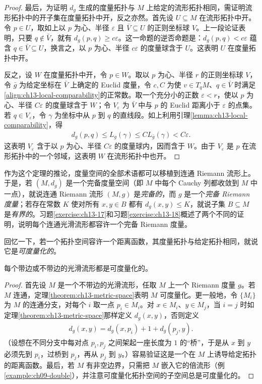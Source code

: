 \documentclass[../../main.tex]{subfiles}
\begin{document}
\begin{proof}
最后，为证明 $d_g$ 生成的度量拓扑与 $M$ 上给定的流形拓扑相同，需证明流形拓扑中的开子集在度量拓扑中开，反之亦然。首先设 $U\subseteq M$ 在流形拓扑中开。令 $p\in U$，取如上以 $p$ 为心、半径 $\varepsilon$ 且 $\bar V\subseteq U$ 的正则坐标球 $V$。上一段论证表明，只要 $q\notin\bar V$，就有 $d_g(p,q)\geqslant c\varepsilon$。这一命题的逆否命题是：$d_g(p,q)<c\varepsilon$ 蕴含 $q\in\bar V\subseteq U$，换言之，以 $p$ 为心、半径 $c\varepsilon$ 的度量球含于 $U$。这表明 $U$ 在度量拓扑中开。

反之，设 $W$ 在度量拓扑中开，令 $p\in W$。取以 $p$ 为心、半径 $r$ 的正则坐标球 $V$，令 $\bar g$ 为给定坐标在 $\bar V$ 上确定的 Euclid 度量，令 $c,C$ 为使 $v\in T_qM$、$q\in\bar V$ 时满足\eqref{align:ch13-local-comparability}的正常数。取一个充分小的正数 $\varepsilon<r$，使以 $p$ 为心、半径 $C\varepsilon$ 的度量球含于 $W$；令 $V_\varepsilon$ 为 $\bar V$ 中与 $p$ 的 Euclid 距离小于 $\varepsilon$ 的点集。若 $q\in V_\varepsilon$，令 $\gamma$ 为坐标中从 $p$ 到 $q$ 的直线段。如上利用引理\ref{lemma:ch13-local-comparability}，得
\begin{align*}
d_g(p,q)\leqslant L_g(\gamma)\leqslant CL_{\bar g}(\gamma)<C\varepsilon.
\end{align*}
这表明 $V_\varepsilon$ 含于以 $p$ 为心、半径 $C\varepsilon$ 的度量球内，因而含于 $W$。由于 $V_\varepsilon$ 是 $p$ 在流形拓扑中的一个邻域，这表明 $W$ 在流形拓扑中也开。
\end{proof}

作为这个定理的推论，度量空间的全部术语都可以移植到连通 Riemann 流形上。于是，若 $(M,d_g)$ 是一个完备度量空间（即 $M$ 中每个 Cauchy 列都收敛到 $M$ 中一点），就说连通 Riemann 流形 $(M,g)$ 是\emph{完备的}，而 $g$ 是一个\emph{完备 Riemann 度量}；若存在常数 $K$ 使对所有 $x,y\in B$ 都有 $d_g(x,y)\leqslant K$，就说子集 $B\subseteq M$ 是\emph{有界的}。习题\ref{exercise:ch13-17}和习题\ref{exercise:ch13-18}概述了两个不同的证明，说明每个连通光滑流形都容许一个完备 Riemann 度量。

回忆一下，若一个拓扑空间容许一个距离函数，其度量拓扑与给定拓扑相同，就说它是\emph{可度量化的}。

\begin{corollary}\label{corollary:ch13-metrizable}
每个带边或不带边的光滑流形都是可度量化的。
\end{corollary}

\begin{proof}
首先设 $M$ 是一个不带边的光滑流形，任取 $M$ 上一个 Riemann 度量 $g$。若 $M$ 连通，定理\ref{theorem:ch13-metric-space}表明 $M$ 可度量化。更一般地，令 $\{M_i\}$ 为 $M$ 的连通分支，对每个 $i$ 取一点 $p_i\in M_i$。对 $x\in M_i$、$y\in M_j$，当 $i=j$ 时如定理\ref{theorem:ch13-metric-space}那样定义 $d_g(x,y)$，否则定义
\begin{align*}
d_g(x,y)=d_g(x,p_i)+1+d_g(p_j,y).
\end{align*}
（设想在不同分支中每对点 $p_i,p_j$ 之间架起一座长度为 $1$ 的“桥”，于是从 $x$ 到 $y$ 必须先到 $p_i$，过桥到 $p_j$，再从 $p_j$ 到 $y$。）容易验证这是一个在 $M$ 上诱导给定拓扑的距离函数。最后，若 $M$ 有非空边界，只需把 $M$ 嵌入它的倍流形（例\ref{example:ch09-double}），并注意可度量化拓扑空间的子空间总是可度量化的。
\end{proof}
\end{document}
